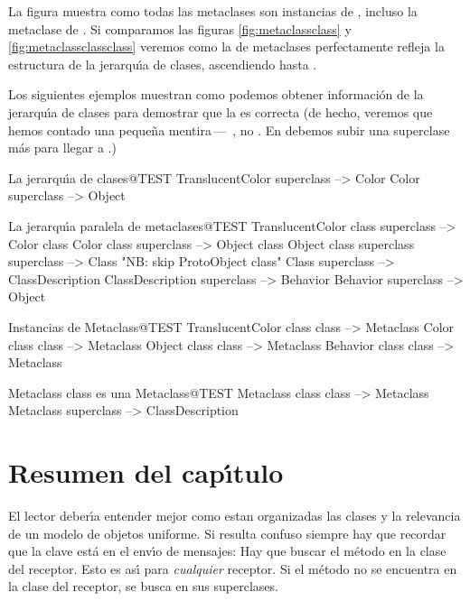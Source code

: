 \documentclass[a4paper,10pt,twoside]{book}
\begin{document}
La figura muestra como todas las metaclases son instancias de , incluso la metaclase de . Si comparamos las figuras \ref{fig:metaclassclass} y \ref{fig:metaclassclassclass} veremos como la  de metaclases perfectamente refleja la estructura de la jerarqu\'{\i}a de clases, ascendiendo hasta .

Los siguientes ejemplos muestran como podemos obtener información de la jerarqu\'{\i}a de clases para demostrar que la  es correcta (de hecho, veremos que hemos contado una peque\~na mentira\,---\, , no . En \pharo debemos subir una superclase más para llegar a .)

\begin{example}{La jerarqu\'{\i}a de clases}{@TEST}
TranslucentColor superclass --> Color
Color superclass                   --> Object
\end{example}

\begin{example}{La jerarqu\'{\i}a paralela de metaclases}{@TEST}
TranslucentColor class superclass   --> Color class
Color class superclass                     --> Object class
Object class superclass superclass --> Class    "NB: skip ProtoObject class"
Class superclass                              --> ClassDescription
ClassDescription superclass            --> Behavior
Behavior superclass                         --> Object
\end{example}

\begin{example}{Instancias de Metaclass}{@TEST}
TranslucentColor class class --> Metaclass
Color class class                   --> Metaclass
Object class class                 --> Metaclass
Behavior class class              --> Metaclass
\end{example}
\begin{example}{Metaclass class es una Metaclass}{@TEST}
Metaclass class class --> Metaclass
Metaclass superclass --> ClassDescription
\end{example}

\section{Resumen del cap\'{\i}tulo}

El lector deber\'{\i}a entender mejor como estan organizadas las clases y la relevancia de un modelo de objetos uniforme. Si resulta confuso siempre hay que recordar que la clave est\'a en el env\'{\i}o de mensajes: Hay que buscar el m\'etodo en la clase del receptor. Esto es as\'{\i} para \emph{cualquier} receptor. Si el m\'etodo no se encuentra en la clase del receptor, se busca en sus superclases.
\end{document}
